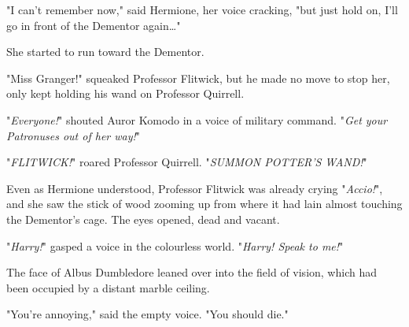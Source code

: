 "I can't remember now," said Hermione, her voice cracking, "but just hold on,
I'll go in front of the Dementor again{\ldots}"

She started to run toward the Dementor.

"Miss Granger!" squeaked Professor Flitwick, but he made no move to stop her,
only kept holding his wand on Professor Quirrell.

"\emph{Everyone!}" shouted Auror Komodo in a voice of military command.
"\emph{Get your Patronuses out of her way!}"

"\emph{FLITWICK!}" roared Professor Quirrell. "\emph{SUMMON POTTER'S WAND!}"

Even as Hermione understood, Professor Flitwick was already crying
"\emph{Accio!}", and she saw the stick of wood zooming up from where it had
lain almost touching the Dementor's cage.
\later
The eyes opened, dead and vacant.

"\emph{Harry!}" gasped a voice in the colourless world. "\emph{Harry! Speak to
me!}"

The face of Albus Dumbledore leaned over into the field of vision, which had
been occupied by a distant marble ceiling.

"You're annoying," said the empty voice. "You should die."

